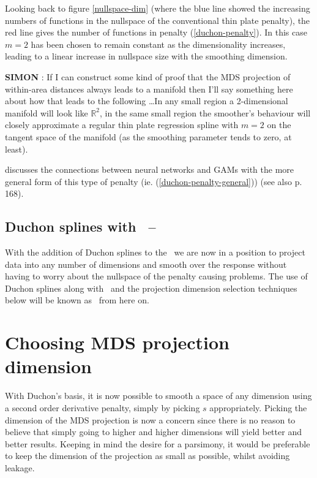 Looking back to figure \ref{nullspace-dim} (where the blue line showed the increasing numbers of functions in the nullspace of the conventional thin plate penalty), the red line gives the number of functions in penalty (\ref{duchon-penalty}). In this case $m=2$ has been chosen to remain constant as the dimensionality increases, leading to a linear increase in nullspace size with the smoothing dimension.

\textbf{SIMON} : If I can construct some kind of proof that the MDS projection of within-area distances always leads to a manifold then I'll say something here about how that leads to the following \ldots In any small region a 2-dimensional manifold will look like $\mathbb{R}^2$, in the same small region the smoother's behaviour will closely approximate a regular thin plate regression spline with $m=2$ on the tangent space of the manifold (as the smoothing parameter tends to zero, at least).

\cite{girosi} discusses the connections between neural networks and GAMs with the more general form of this type of penalty (ie. (\ref{duchon-penalty-general})) (see also \cite{elements} p. 168).

\subsection{Duchon splines with \mdsap\ -- \mdsds}

With the addition of Duchon splines to the \mdsap\ we are now in a position to project data into any number of dimensions and smooth over the response without having to worry about the nullspace of the penalty causing problems. The use of Duchon splines along with \mdsap\ and the projection dimension selection techniques below will be known as \mdsds\ from here on.

\section{Choosing MDS projection dimension}

With Duchon's basis, it is now possible to smooth a space of any dimension using a second order derivative penalty, simply by picking $s$ appropriately. Picking the dimension of the MDS projection is now a concern since there is no reason to believe that simply going to higher and higher dimensions will yield better and better results. Keeping in mind the desire for a parsimony, it would be preferable to keep the dimension of the projection as small as possible, whilst avoiding leakage.

